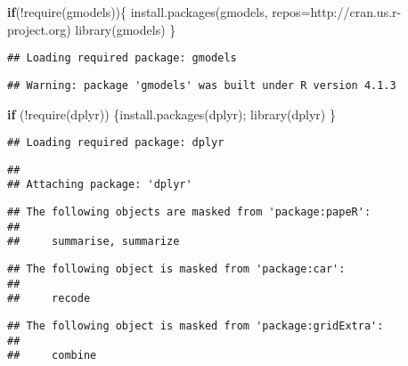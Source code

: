\documentclass[
]{article}
\newenvironment{Shaded}{\begin{snugshade}}{\end{snugshade}}
\newcommand{\AttributeTok}[1]{\textcolor[rgb]{0.77,0.63,0.00}{#1}}
\newcommand{\ControlFlowTok}[1]{\textcolor[rgb]{0.13,0.29,0.53}{\textbf{#1}}}
\newcommand{\FunctionTok}[1]{\textcolor[rgb]{0.00,0.00,0.00}{#1}}
\newcommand{\NormalTok}[1]{#1}
\newcommand{\SpecialCharTok}[1]{\textcolor[rgb]{0.00,0.00,0.00}{#1}}
\newcommand{\StringTok}[1]{\textcolor[rgb]{0.31,0.60,0.02}{#1}}
\begin{document}
\begin{Shaded}
\begin{Highlighting}[]
\ControlFlowTok{if}\NormalTok{(}\SpecialCharTok{!}\FunctionTok{require}\NormalTok{(gmodels))\{}
    \FunctionTok{install.packages}\NormalTok{(}\StringTok{\textquotesingle{}gmodels\textquotesingle{}}\NormalTok{, }\AttributeTok{repos=}\StringTok{\textquotesingle{}http://cran.us.r{-}project.org\textquotesingle{}}\NormalTok{)}
    \FunctionTok{library}\NormalTok{(gmodels)}
\NormalTok{\}}
\end{Highlighting}
\end{Shaded}

\begin{verbatim}
## Loading required package: gmodels
\end{verbatim}

\begin{verbatim}
## Warning: package 'gmodels' was built under R version 4.1.3
\end{verbatim}

\begin{Shaded}
\begin{Highlighting}[]
\ControlFlowTok{if}\NormalTok{ (}\SpecialCharTok{!}\FunctionTok{require}\NormalTok{(}\StringTok{\textquotesingle{}dplyr\textquotesingle{}}\NormalTok{)) \{}\FunctionTok{install.packages}\NormalTok{(}\StringTok{\textquotesingle{}dplyr\textquotesingle{}}\NormalTok{); }\FunctionTok{library}\NormalTok{(}\StringTok{\textquotesingle{}dplyr\textquotesingle{}}\NormalTok{)}
\NormalTok{\}}
\end{Highlighting}
\end{Shaded}

\begin{verbatim}
## Loading required package: dplyr
\end{verbatim}

\begin{verbatim}
## 
## Attaching package: 'dplyr'
\end{verbatim}

\begin{verbatim}
## The following objects are masked from 'package:papeR':
## 
##     summarise, summarize
\end{verbatim}

\begin{verbatim}
## The following object is masked from 'package:car':
## 
##     recode
\end{verbatim}

\begin{verbatim}
## The following object is masked from 'package:gridExtra':
## 
##     combine
\end{verbatim}
\end{document}

